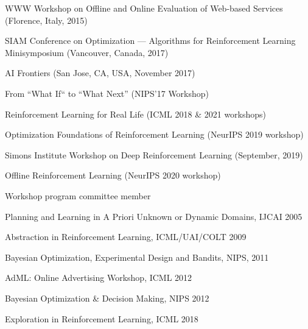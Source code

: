 \documentclass[10pt,twoside,letterpaper]{article}
\newcommand{\negitemspace}{\vspace{1mm}}
\begin{document}
\begin{compactitem}
\begin{compactitem}
\begin{compactitem}
\item{WWW Workshop on Offline and Online Evaluation of Web-based Services (Florence, Italy, 2015)}

\item{SIAM Conference on Optimization --- Algorithms for Reinforcement Learning Minisymposium (Vancouver, Canada, 2017)}

\item{AI Frontiers (San Jose, CA, USA, November 2017)}

\item{From “What If“ to “What Next” (NIPS’17 Workshop)}

\item{Reinforcement Learning for Real Life (ICML 2018 \& 2021 workshops)}

\item{Optimization Foundations of Reinforcement Learning (NeurIPS 2019 workshop)}

\item{Simons Institute Workshop on Deep Reinforcement Learning (September, 2019)}

\item{Offline Reinforcement Learning (NeurIPS 2020 workshop)}

\end{compactitem}

\item{Workshop program committee member}

\begin{compactitem}

\item{Planning and Learning in A Priori Unknown or Dynamic Domains, IJCAI 2005}

\item{Abstraction in Reinforcement Learning, ICML/UAI/COLT 2009}

\item{Bayesian Optimization, Experimental Design and Bandits, NIPS, 2011}

\item{AdML: Online Advertising Workshop, ICML 2012}

\item{Bayesian Optimization \& Decision Making, NIPS 2012}

\item{Exploration in Reinforcement Learning, ICML 2018}

\end{compactitem}

\end{compactitem} \negitemspace


\end{compactitem}
\end{document}
